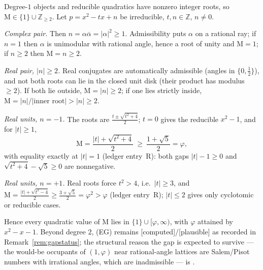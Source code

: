 \documentclass[11pt]{article}
\theoremstyle{plain}
\theoremstyle{definition}
\theoremstyle{remark}
\newcommand{\Z}{\mathbb{Z}}
\newcommand{\Mah}{\mathrm{M}}
\newcommand{\C}{\textnormal{[computed]}}
\newcommand{\Pl}{\textnormal{[plausible]}}
\begin{document}
Degree-$1$ objects and reducible quadratics have nonzero integer roots, so
$\Mah\in\{1\}\cup\Z_{\ge2}$. Let $p=x^2-tx+n$ be irreducible, $t,n\in\Z$,
$n\neq0$.

\emph{Complex pair.} Then $n=\alpha\overline{\alpha}=|\alpha|^2\ge1$.
Admissibility puts $\alpha$ on a rational ray; if $n=1$ then $\alpha$ is
unimodular with rational angle, hence a root of unity and $\Mah=1$; if
$n\ge2$ then $\Mah=n\ge2$.

\emph{Real pair, $|n|\ge2$.} Real conjugates are automatically admissible
(angles in $\{0,\tfrac12\}$), and not both roots can lie in the closed unit
disk (their product has modulus $\ge2$). If both lie outside, $\Mah=|n|\ge2$;
if one lies strictly inside, $\Mah=|n|/|\text{inner root}|>|n|\ge2$.

\emph{Real units, $n=-1$.} The roots are $\frac{t\pm\sqrt{t^2+4}}{2}$; $t=0$
gives the reducible $x^2-1$, and for $|t|\ge1$,
\[
\Mah=\frac{|t|+\sqrt{t^2+4}}{2}\ \ge\ \frac{1+\sqrt5}{2}=\varphi,
\]
with equality exactly at $|t|=1$ (ledger entry~R): both gaps $|t|-1\ge0$ and
$\sqrt{t^2+4}-\sqrt5\ge0$ are nonnegative.

\emph{Real units, $n=+1$.} Real roots force $t^2>4$, i.e.\ $|t|\ge3$, and
$\Mah=\frac{|t|+\sqrt{t^2-4}}{2}\ge\frac{3+\sqrt5}{2}=\varphi^2>\varphi$
(ledger entry~R); $|t|\le2$ gives only cyclotomic or reducible cases.

Hence every quadratic value of $\Mah$ lies in $\{1\}\cup[\varphi,\infty)$,
with $\varphi$ attained by $x^2-x-1$. Beyond degree $2$, \textup{(EG)}
remains \C/\Pl{} as recorded in Remark~\ref{rem:gapstatus}; the structural
reason the gap is expected to survive --- the would-be occupants of
$(1,\varphi)$ near rational-angle lattices are Salem/Pisot numbers with
irrational angles, which are inadmissible --- is \cite[Lem.~6.1,
Thm.~6.2]{CMC}.
\end{document}
